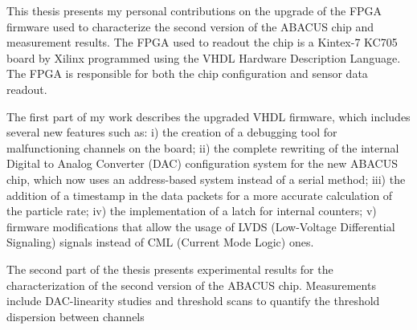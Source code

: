 This thesis presents my personal contributions on the upgrade of the FPGA firmware used to characterize
the second version of the ABACUS chip and measurement results.
The FPGA used to readout the chip is a Kintex-7 KC705 board by Xilinx programmed using the VHDL Hardware Description Language. The FPGA
is responsible for both the chip configuration and sensor data readout.

\noindent The first part of my work describes the upgraded VHDL firmware, which includes several new features such as:
i) the creation of a debugging tool for malfunctioning channels on the board;
ii) the complete rewriting of the internal Digital to Analog Converter (DAC) configuration system for the new ABACUS chip, which
now uses an address-based system instead of a serial method;
iii) the addition of a timestamp in the data packets for a more accurate calculation of the particle rate;
iv) the implementation of a latch for internal counters;
v) firmware modifications that allow the usage of LVDS (Low-Voltage Differential Signaling) signals instead of CML (Current Mode Logic) ones.

The second part of the thesis presents experimental results for the characterization of the second version of the ABACUS chip.
Measurements include DAC-linearity studies and threshold scans to quantify the threshold dispersion between channels
